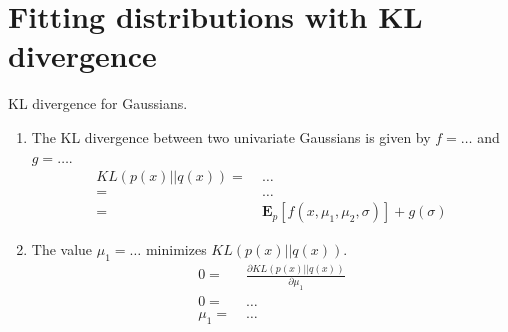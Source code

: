\section{Fitting distributions with KL divergence}

KL divergence for Gaussians.
  \begin{enumerate}
  \item The KL divergence between two univariate Gaussians is given by
    $f = \ldots$ and $g = \ldots$.
    \begin{align*}
      KL(p(x) || q(x)) =&\; \ldots \\
      =&\; \ldots \\
      =&\; \mathbf{E}_p[ f(x, \mu_1, \mu_2, \sigma)] + g(\sigma)
    \end{align*}
  \item The value $\mu_1 = \ldots$ minimizes $KL(p(x)||q(x))$.
    \begin{align*}
      0 =&\; \frac{\partial KL(p(x) || q(x))}{\partial \mu_1} \\
      0 =&\; \ldots \\
      \mu_1 =&\; \ldots
    \end{align*}
  \end{enumerate}

